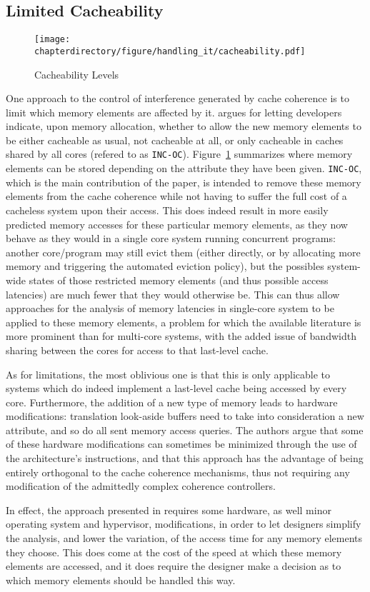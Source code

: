 \subsection{Limited Cacheability}
\begin{figure}
\begin{center}
\texttt{[image: \\chapterdirectory/figure/handling\_it/cacheability.pdf]}
\end{center}
\caption{Cacheability Levels}%
\label{fig:handling_it:cacheability}
\end{figure}

One approach to the control of interference generated by cache coherence is to
limit which memory elements are affected by it. \cite{bansal2019cache} argues
for letting developers indicate, upon memory allocation, whether to allow the
new memory elements to be either cacheable as usual, not cacheable at all, or
only cacheable in caches shared by all cores (refered to as \texttt{INC-OC}).
Figure~\ref{fig:handling_it:cacheability} summarizes where memory elements can
be stored depending on the attribute they have been given.  \texttt{INC-OC},
which is the main contribution of the paper, is intended to remove these memory
elements from the cache coherence while not having to suffer the full cost of a
cacheless system upon their access. This does indeed result in more easily
predicted memory accesses for these particular memory elements, as they now
behave as they would in a single core system running concurrent programs:
another core/program may still evict them (either directly, or by allocating
more memory and triggering the automated eviction policy), but the possibles
system-wide states of those restricted memory elements (and thus possible
access latencies) are much fewer that they would otherwise be. This can thus
allow approaches for the analysis of memory latencies in single-core system to
be applied to these memory elements, a problem for which the available
literature is more prominent than for multi-core systems, with the added issue
of bandwidth sharing between the cores for access to that last-level cache.

As for limitations, the most oblivious one is that this is only applicable to
systems which do indeed implement a last-level cache being accessed by every
core. Furthermore, the addition of a new type of memory leads to hardware
modifications: translation look-aside buffers need to take into consideration a
new attribute, and so do all sent memory access queries. The authors argue that
some of these hardware modifications can sometimes be minimized through the use
of the architecture's instructions, and that this approach has the advantage of
being entirely orthogonal to the cache coherence mechanisms, thus not requiring
any modification of the admittedly complex coherence controllers.

In effect, the approach presented in \cite{bansal2019cache} requires some
hardware, as well minor operating system and hypervisor, modifications, in
order to let designers simplify the analysis, and lower the variation, of the
access time for any memory elements they choose. This does come at the cost of
the speed at which these memory elements are accessed, and it does require the
designer make a decision as to which memory elements should be handled this way.
